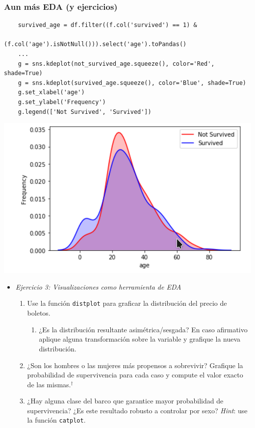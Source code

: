 \documentclass[leqno, 10pt, envcountsect]{beamer}
\numberwithin{equation}{section}
\theoremstyle{definition}
\theoremstyle{example}
\numberwithin{figure}{section}
\numberwithin{table}{section}
\let\olditem\item
\renewcommand{\item}{%
\olditem\vspace{1pt}}
\begin{document}
\begin{frame}[fragile=singleslide]
  \frametitle{Aun más EDA (y ejercicios)}
    \begin{verbatim}
    survived_age = df.filter((f.col('survived') == 1) &
                   (f.col('age').isNotNull())).select('age').toPandas()
    ...
    g = sns.kdeplot(not_survived_age.squeeze(), color='Red', shade=True)
    g = sns.kdeplot(survived_age.squeeze(), color='Blue', shade=True)
    g.set_xlabel('age')
    g.set_ylabel('Frequency')
    g.legend(['Not Survived', 'Survived'])
    \end{verbatim}
    \begin{center}
      \includegraphics[scale=0.12]{kde.png}
    \end{center}
  \begin{itemize}
    \item \textit{Ejercicio 3: Visualizaciones como herramienta de EDA}
      \begin{enumerate}
        \item Use la función \texttt{distplot} para graficar la distribución del
          precio de boletos.
          \begin{enumerate}
            \item ¿Es la distribución resultante asimétrica/sesgada? En caso
              afirmativo aplique alguna transformación sobre la variable y
              grafique la nueva distribución.
          \end{enumerate}
        \item ¿Son los hombres o las mujeres más propensos a sobrevivir?
          Grafique la probabilidad de supervivencia para cada caso y compute el
          valor exacto de las mismas.$^{\dag}$
        \item ¿Hay alguna clase del barco que garantice mayor probabilidad de
          supervivencia? ¿Es este resultado robusto a controlar por sexo?
          \textit{Hint}: use la función \texttt{catplot}.
      \end{enumerate}
  \end{itemize}
\end{frame}
\end{document}
